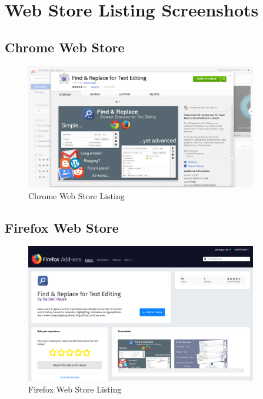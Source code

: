 \documentclass[bsc,frontabs,twoside,singlespacing,parskip,deptreport]{infthesis}
\begin{document}
\chapter{Web Store Listing Screenshots}

\section{Chrome Web Store}
\begin{figure}[h]
\centering
\includegraphics[width=0.9\textwidth]{../docs/chrome-webstore-listing.png}
\caption{Chrome Web Store Listing}
\end{figure}

\section{Firefox Web Store}
\begin{figure}[h]
\centering
\includegraphics[width=0.9\textwidth]{../docs/firefox-webstore-listing.png}
\caption{Firefox Web Store Listing}
\end{figure}




\end{document}
